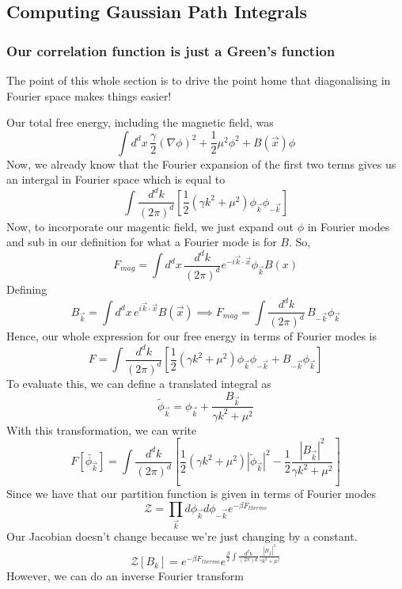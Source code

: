 \documentclass[11pt, oneside]{article}   	%
\begin{document}
\subsection{Computing Gaussian Path Integrals}

\subsubsection{Our correlation function is just a Green's function} 
The point of this whole section is to drive the point home 
that diagonalising in Fourier space makes things easier!

Our total free energy, including the magnetic field, was
 \[
	 \int d^ d x \, \frac{\gamma}{2 } ( \nabla \phi ) ^ 2 + \frac{1}{2 }\mu^ 2 \phi ^ 2 + B ( \vec{x} ) \phi 
 \] Now, we already know that the Fourier expansion of the first two terms gives us an intergal in Fourier space which is equal to 
 \[
	 \int \frac{ d^ d k}{ ( 2 \pi ) ^ d } \left[  \frac{1}{2 } \left(  \gamma k^ 2 + \mu^ 2  \right) \phi_{ \vec{k} } \phi_{  - \vec{k} }   \right] 
 \] Now, to incorporate our magentic field, we just expand out $ \phi $ in Fourier modes 
 and sub in our definition for what a Fourier mode is for $ B $. 
 So, 
 \[
	 F_{ mag } = \int d^ d x \, \frac{ d^ d  k }{ ( 2 \pi ) ^ d } e^{  - i \vec{k} \cdot  \vec{x} } \phi_{ \vec{k}  } B ( x )
 \] Defining 
 \[
	 B_{ \vec{k}}  = \int d^d x \, e^{  i \vec{k} \cdot  \vec{x} } B ( \vec{x} ) \implies F_{ mag } = \int \frac{ d ^ d k }{ ( 2 \pi ) ^ d  } \, B_{ - \vec{k} } \phi_{ \vec{k}}
 \] Hence, our whole expression for our free energy in terms of 
 Fourier modes is 
 \[
	 F  = \int \frac{ d^ d k }{ ( 2 \pi ) ^ d } \left[  \frac{1}{2 }( \gamma k ^ 2 + \mu ^ 2 ) \phi_{\vec{k} } \phi_{  - \vec{k} } + B_{ - \vec{k} } \phi_{ \vec{k}} \right] 
 \] To evaluate this, we can define a translated integral as 
\[
 \tilde{\phi}_{\vec{k}} = \phi_{ \vec{k} } + \frac{B_{ \vec{k} }}{\gamma k ^  2+ \mu^ 2 } 
\] With this transformation, we can write 
\[
F [ \tilde{ \phi_{ \vec{k} } }] = \int \frac{ d^ d k }{ ( 2 \pi ) ^ d } \left[  \frac{1}{2 } ( \gamma k^ 2 + \mu ^ 2 ) | \tilde{\phi }_{ \vec{k}} |^ 2 - \frac{1}{2 } \frac{ | B_{ \vec{k} } | ^ 2  }{ \gamma k ^ 2 + \mu ^ 2 }  \right]   
\] Since we have that our partition function is given in terms of Fourier modes 
\[
 \mathcal{ Z } = \prod_{ \vec{k}} d \phi_{ \vec{k} } d\phi_{ - \vec{k} } e^{  - \beta F_{ thermo}}
\] Our Jacobian doesn't change because we're just changing by a constant. 
\[
	\mathcal{ Z } [ B_{ { k } } ] = e^{  - \beta F_{ thermo } }e^{ \frac{\beta}{2 } \int \frac{ d^ d k }{ ( 2 \pi ) d } \frac{ | B_{ \vec{k} } | ^ 2 }{\gamma k^ 2 + \mu ^ 2 }}
\] However, we can do an inverse Fourier transform 
\end{document}
